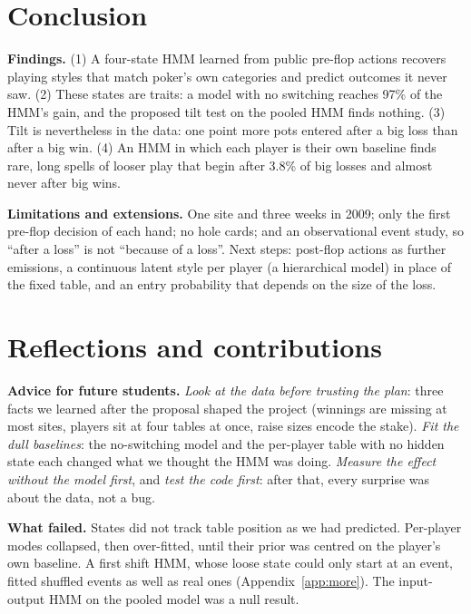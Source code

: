 \section{Conclusion}
\textbf{Findings.} (1) A four-state HMM learned from public pre-flop actions recovers playing styles that match poker's own categories and predict outcomes it never saw. (2) These states are traits: a model with no switching reaches 97\% of the HMM's gain, and the proposed tilt test on the pooled HMM finds nothing. (3) Tilt is nevertheless in the data: one point more pots entered after a big loss than after a big win. (4) An HMM in which each player is their own baseline finds rare, long spells of looser play that begin after 3.8\% of big losses and almost never after big wins.

\textbf{Limitations and extensions.} One site and three weeks in 2009; only the first pre-flop decision of each hand; no hole cards; and an observational event study, so ``after a loss'' is not ``because of a loss''. Next steps: post-flop actions as further emissions, a continuous latent style per player (a hierarchical model) in place of the fixed table, and an entry probability that depends on the size of the loss.

\section{Reflections and contributions}
\textbf{Advice for future students.} \emph{Look at the data before trusting the plan}: three facts we learned after the proposal shaped the project (winnings are missing at most sites, players sit at four tables at once, raise sizes encode the stake). \emph{Fit the dull baselines}: the no-switching model and the per-player table with no hidden state each changed what we thought the HMM was doing. \emph{Measure the effect without the model first}, and \emph{test the code first}: after that, every surprise was about the data, not a bug.

\textbf{What failed.} States did not track table position as we had predicted. Per-player modes collapsed, then over-fitted, until their prior was centred on the player's own baseline. A first shift HMM, whose loose state could only start at an event, fitted shuffled events as well as real ones (Appendix~\ref{app:more}). The input-output HMM on the pooled model was a null result.


